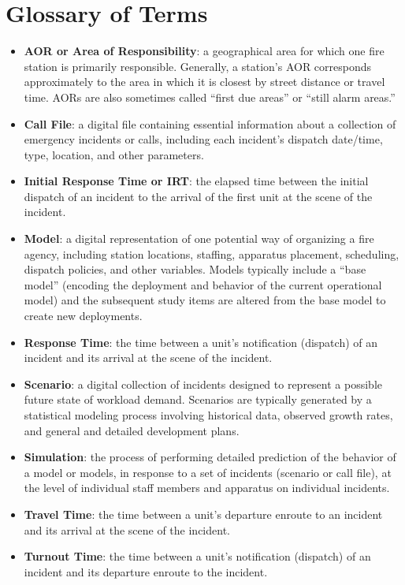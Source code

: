 \chapter*{Glossary of Terms}
\label{chap:glossary_of_terms}
\begin{itemize}
    \item \textbf{AOR or Area of Responsibility}: a geographical area for which one fire station is primarily responsible. Generally, a station’s AOR corresponds approximately to the area in which it is closest by street distance or travel time. AORs are also sometimes called “first due areas” or “still alarm areas.”
    \item \textbf{Call File}: a digital file containing essential information about a collection of emergency incidents or calls, including each incident’s dispatch date/time, type, location, and other parameters.
    \item \textbf{Initial Response Time or IRT}: the elapsed time between the initial dispatch of an incident to the arrival of the first unit at the scene of the incident.
    \item \textbf{Model}: a digital representation of one potential way of organizing a fire agency, including station locations, staffing, apparatus placement, scheduling, dispatch policies, and other variables. Models typically include a “base model” (encoding the deployment and behavior of the current operational model) and the subsequent study items are altered from the base model to create new deployments.
    \item \textbf{Response Time}: the time between a unit’s notification (dispatch) of an incident and its arrival at the scene of the incident.
    \item \textbf{Scenario}: a digital collection of incidents designed to represent a possible future state of workload demand. Scenarios are typically generated by a statistical modeling process involving historical data, observed growth rates, and general and detailed development plans.
    \item \textbf{Simulation}: the process of performing detailed prediction of the behavior of a model or models, in response to a set of incidents (scenario or call file), at the level of individual staff members and apparatus on individual incidents.
    \item \textbf{Travel Time}: the time between a unit’s departure enroute to an incident and its arrival at the scene of the incident.
    \item \textbf{Turnout Time}: the time between a unit’s notification (dispatch) of an incident and its departure enroute to the incident.
\end{itemize}